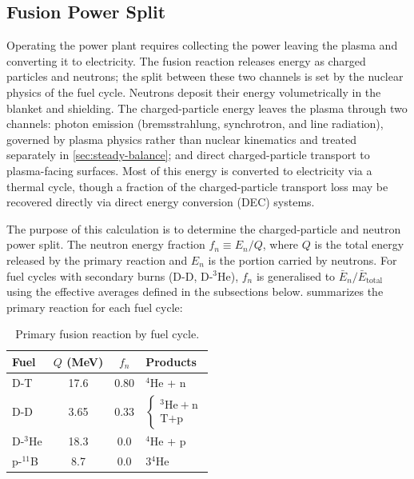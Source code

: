 \documentclass{article}
\begin{document}
\subsection{Fusion Power Split}
\label{sec:fusion-power-split}

Operating the power plant requires collecting the power leaving the
plasma and converting it to electricity. The fusion reaction releases
energy as charged particles and neutrons; the split between these two
channels is set by the nuclear physics of the fuel cycle. Neutrons
deposit their energy volumetrically in the blanket and shielding. The
charged-particle energy leaves the plasma through two channels: photon
emission (bremsstrahlung, synchrotron, and line radiation), governed
by plasma physics rather than nuclear kinematics and treated
separately in \cref{sec:steady-balance}; and direct charged-particle
transport to plasma-facing surfaces. Most of this energy is converted
to electricity via a thermal cycle, though a fraction of the
charged-particle transport loss may be recovered directly via direct
energy conversion (DEC) systems.

The purpose of this calculation is to determine the charged-particle
and neutron power split.
The neutron energy fraction
$f_n \equiv E_n / Q$, where $Q$ is the total energy released by the
primary reaction and $E_n$ is the portion carried by neutrons.
For fuel cycles with secondary burns (D-D, D-${}^3$He), $f_n$ is
generalised to $\bar{E}_n / \bar{E}_{\text{total}}$ using the
effective averages defined in the subsections below.
 summarizes the primary reaction
for each fuel cycle:

\begin{table}[htbp]
\caption{Primary fusion reaction by fuel cycle.}
\label{tab:fusion-reactions}
\centering
\renewcommand{\arraystretch}{1.3}
\begin{tabular}{lccl}
\toprule
Fuel & $Q$ (MeV) & $f_n$ & Products \\
\midrule
D-T           & 17.6  & 0.80 & ${}^4$He + n \\
D-D           & 3.65  & 0.33 & $\begin{cases} {}^3\text{He} + \text{n} \\ \text{T} + \text{p} \end{cases}$ \\
D-${}^3$He    & 18.3  & 0.0  & ${}^4$He + p \\
p-${}^{11}$B  & 8.7   & 0.0  & 3${}^4$He \\
\bottomrule
\end{tabular}
\end{table}
\end{document}
